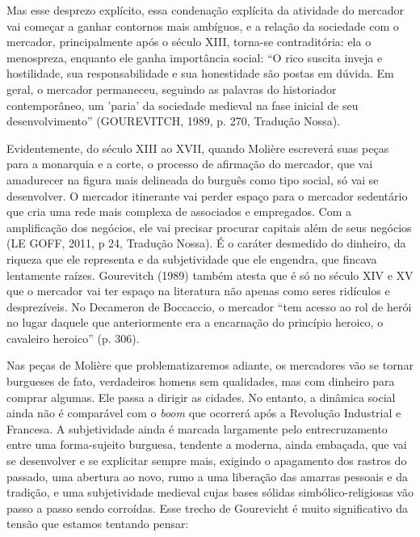 Mas esse desprezo explícito, essa condenação explícita da atividade do
mercador vai começar a ganhar contornos mais ambíguos, e a relação da
sociedade com o mercador, principalmente após o século XIII, torna-se
contraditória: ela o menospreza, enquanto ele ganha importância social:
``O rico suscita inveja e hostilidade, sua responsabilidade e sua
honestidade são postas em dúvida. Em geral, o mercador permaneceu,
seguindo as palavras do historiador contemporâneo, um 'paria' da
sociedade medieval na fase inicial de seu desenvolvimento'' (GOUREVITCH,
1989, p. 270, Tradução Nossa).

Evidentemente, do século XIII ao XVII, quando Molière escreverá suas
peças para a monarquia e a corte, o processo de afirmação do mercador,
que vai amadurecer na figura mais delineada do burguês como tipo social,
só vai se desenvolver. O mercador itinerante vai perder espaço para o
mercador sedentário que cria uma rede mais complexa de associados e
empregados. Com a amplificação dos negócios, ele vai precisar procurar
capitais além de seus negócios (LE GOFF, 2011, p 24, Tradução Nossa). É
o caráter desmedido do dinheiro, da riqueza que ele representa e da
subjetividade que ele engendra, que fincava lentamente raízes.
Gourevitch (1989) também atesta que é só no século XIV e XV que o
mercador vai ter espaço na literatura não apenas como seres ridículos e
desprezíveis. No Decameron de Boccaccio, o mercador ``tem acesso ao rol
de herói no lugar daquele que anteriormente era a encarnação do
princípio heroico, o cavaleiro heroico'' (p. 306).

Nas peças de Molière que problematizaremos adiante, os mercadores vão se
tornar burgueses de fato, verdadeiros homens sem qualidades, mas com
dinheiro para comprar algumas. Ele passa a dirigir as cidades. No
entanto, a dinâmica social ainda não é comparável com o \emph{boom} que
ocorrerá após a Revolução Industrial e Francesa. A subjetividade ainda é
marcada largamente pelo entrecruzamento entre uma forma-sujeito
burguesa, tendente a moderna, ainda embaçada, que vai se desenvolver e
se explicitar sempre mais, exigindo o apagamento dos rastros do passado,
uma abertura ao novo, rumo a uma liberação das amarras pessoais e da
tradição, e uma subjetividade medieval cujas bases sólidas
simbólico-religiosas vão passo a passo sendo corroídas. Esse trecho de
Gourevicht é muito significativo da tensão que estamos tentando pensar:

